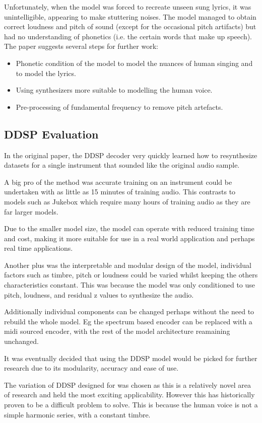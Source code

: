 Unfortunately, when the model was forced to recreate unseen sung lyrics, it was unintelligible, appearing to make stuttering noises. The model managed to obtain correct loudness and pitch of sound (except for the occasional pitch artifacts) but had no understanding of phonetics (i.e. the certain words that make up speech). The paper suggests several steps for further work:

\begin{itemize}
    \item Phonetic condition of the model to model the nuances of human singing and to model the lyrics.
    \item Using synthesizers more suitable to modelling the human voice.
    \item Pre-processing of fundamental frequency to remove pitch artefacts.
\end{itemize}

\subsection{DDSP Evaluation}

In the original paper, the DDSP decoder very quickly learned how to resynthesize datasets for a single instrument that sounded like the original audio sample.

A big pro of the method was accurate training on an instrument could be undertaken with as little as 15 minutes of training audio. This contrasts to models such as Jukebox which require many hours of training audio as they are far larger models.

Due to the smaller model size, the model can operate with reduced training time and cost, making it more suitable for use in a real world application and perhaps real time applications.

Another plus was the interpretable and modular design of the model, individual factors such as timbre, pitch or loudness could be varied whilst keeping the others characteristics constant. This was because the model was only conditioned to use pitch, loudness, and residual z values to synthesize the audio.

Additionally individual components can be changed perhaps without the need to rebuild the whole model. Eg the spectrum based encoder can be replaced with a midi sourced encoder, with the rest of the model architecture reamaining unchanged.

It was eventually decided that using the DDSP model would be picked for further research due to its modularity, accuracy and ease of use.

The variation of DDSP designed for  was chosen as this is a relatively novel area of research and held the most exciting applicability. However this has historically proven to be a difficult problem to solve. This is because the human voice is not a simple harmonic series, with a constant timbre.